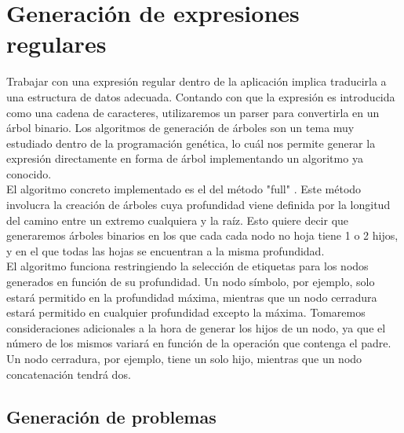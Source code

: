
\section{Generación de expresiones regulares}

Trabajar con una expresión regular dentro de la aplicación implica traducirla a una estructura de datos adecuada.
Contando con que la expresión es introducida como una cadena de caracteres, utilizaremos un parser para convertirla en un árbol binario.
Los algoritmos de generación de árboles son un tema muy estudiado dentro de la programación genética, lo cuál nos permite generar la expresión directamente en forma de árbol implementando un algoritmo ya conocido.
\\
El algoritmo concreto implementado es el del método "full" \cite{koza92}.
Este método involucra la creación de árboles cuya profundidad viene definida por la longitud del camino entre un extremo cualquiera y la raíz.
Esto quiere decir que generaremos árboles binarios en los que cada cada nodo no hoja tiene 1 o 2 hijos, y en el que todas las hojas se encuentran a la misma profundidad.
\\
El algoritmo funciona restringiendo la selección de etiquetas para los nodos generados en función de su profundidad.
Un nodo símbolo, por ejemplo, solo estará permitido en la profundidad máxima, mientras que un nodo cerradura estará permitido en cualquier profundidad excepto la máxima.
Tomaremos consideraciones adicionales a la hora de generar los hijos de un nodo, ya que el número de los mismos variará en función de la operación que contenga el padre.
Un nodo cerradura, por ejemplo, tiene un solo hijo, mientras que un nodo concatenación tendrá dos.

\subsection{Generación de problemas}

